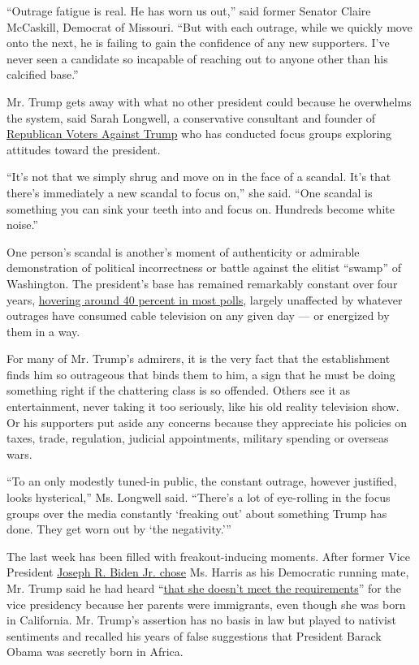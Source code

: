 ``Outrage fatigue is real. He has worn us out,'' said former Senator
Claire McCaskill, Democrat of Missouri. ``But with each outrage, while
we quickly move onto the next, he is failing to gain the confidence of
any new supporters. I've never seen a candidate so incapable of reaching
out to anyone other than his calcified base.''

Mr. Trump gets away with what no other president could because he
overwhelms the system, said Sarah Longwell, a conservative consultant
and founder of
\href{https://www.nytimes3xbfgragh.onion/2020/05/28/us/politics/republican-voters-against-trump.html}{Republican
Voters Against Trump} who has conducted focus groups exploring attitudes
toward the president.

``It's not that we simply shrug and move on in the face of a scandal.
It's that there's immediately a new scandal to focus on,'' she said.
``One scandal is something you can sink your teeth into and focus on.
Hundreds become white noise.''

One person's scandal is another's moment of authenticity or admirable
demonstration of political incorrectness or battle against the elitist
``swamp'' of Washington. The president's base has remained remarkably
constant over four years,
\href{https://news.gallup.com/poll/203207/trump-job-approval-weekly.aspx}{hovering
around 40 percent in most polls}, largely unaffected by whatever
outrages have consumed cable television on any given day --- or
energized by them in a way.

For many of Mr. Trump's admirers, it is the very fact that the
establishment finds him so outrageous that binds them to him, a sign
that he must be doing something right if the chattering class is so
offended. Others see it as entertainment, never taking it too seriously,
like his old reality television show. Or his supporters put aside any
concerns because they appreciate his policies on taxes, trade,
regulation, judicial appointments, military spending or overseas wars.

``To an only modestly tuned-in public, the constant outrage, however
justified, looks hysterical,'' Ms. Longwell said. ``There's a lot of
eye-rolling in the focus groups over the media constantly `freaking out'
about something Trump has done. They get worn out by `the negativity.'''

The last week has been filled with freakout-inducing moments. After
former Vice President
\href{https://www.nytimes3xbfgragh.onion/2020/08/11/us/politics/kamala-harris-vp-biden.html}{Joseph
R. Biden Jr. chose} Ms. Harris as his Democratic running mate, Mr. Trump
said he had heard
``\href{https://www.nytimes3xbfgragh.onion/2020/08/13/us/politics/trump-kamala-harris.html}{that
she doesn't meet the requirements}'' for the vice presidency because her
parents were immigrants, even though she was born in California. Mr.
Trump's assertion has no basis in law but played to nativist sentiments
and recalled his years of false suggestions that President Barack Obama
was secretly born in Africa.

